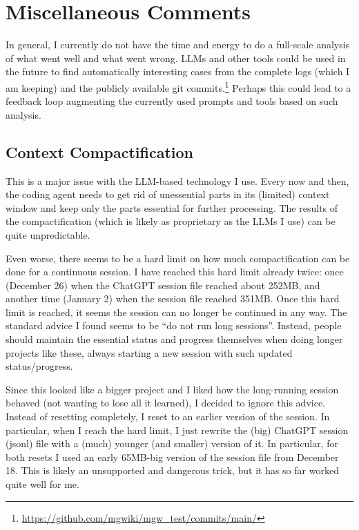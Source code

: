 \documentclass[a4paper,UKenglish,cleveref, autoref, thm-restate]{lipics-v2021}
\begin{document}
\section{Miscellaneous Comments}

In general, I currently do not have the time and energy to do a full-scale
analysis of what went well and what went wrong. LLMs and other tools
could be used in the future to find automatically interesting cases from
the complete logs (which I am keeping) and the publicly available git commits.\footnote{\url{https://github.com/mgwiki/mgw_test/commits/main/}}
Perhaps this could lead to a
feedback loop augmenting the currently used prompts and tools based on such analysis.

\subsection{Context Compactification}
This is a major issue with the LLM-based technology I use. Every now and then, the
coding agent needs to get rid of unessential parts in its (limited) context
window and keep only the parts essential for further processing. The results of the
compactification (which is likely as proprietary as the LLMs I use) can be quite unpredictable.

Even worse, there seems to be a hard limit on how much compactification can be
done for a continuous session. I have reached this hard limit already twice:
once (December 26) when the ChatGPT session file reached about 252MB, and
another time (January 2) when the session file reached 351MB. Once this hard
limit is reached, it seems the session can no longer be continued in any way.
The standard advice I found seems to be ``do not run long sessions''. Instead,
people should maintain the essential status and progress themselves when doing
longer projects like these, always starting a new session with such updated status/progress.

Since this looked like a bigger project and I liked how the long-running session
behaved (not wanting to lose all it learned), I decided to ignore this
advice. Instead of resetting completely, I reset to an earlier version of the
session. In particular, when I reach the hard limit, I just rewrite the (big)
ChatGPT session (jsonl) file with a (much) younger (and smaller) version of
it. In particular, for both resets I used an early 65MB-big version of the
session file from December 18. This is likely an unsupported and dangerous
trick, but it has so far worked quite well for me.
\end{document}
